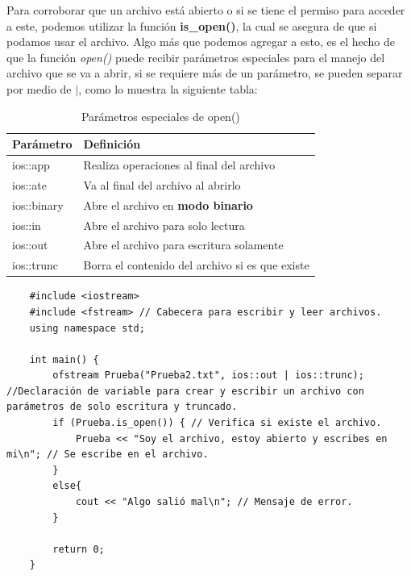 Para corroborar que un archivo está abierto o si se tiene el permiso para acceder a este, podemos utilizar la función \textbf{is\_open()}, la cual se asegura de que si podamos usar el archivo. Algo más que podemos agregar a esto, es el hecho de que la función \textit{open()} puede recibir parámetros especiales para el manejo del archivo que se va a abrir, si se requiere más de un parámetro, se pueden separar por medio de $|$, como lo muestra la siguiente tabla:
\begin{table}[H]
    \begin{center}
        \caption{Parámetros especiales de open()}
        \label{tab: 15}
        \begin{tabular}{l l}
            \hline
            \textbf{Parámetro} & \textbf{Definición} \\
            \hline
            ios::app		& Realiza operaciones al final del archivo \\
            ios::ate		& Va al final del archivo al abrirlo \\
            ios::binary	& Abre el archivo en \textbf{modo binario} \\
            ios::in		& Abre el archivo para solo lectura \\
            ios::out		& Abre el archivo para escritura solamente \\
            ios::trunc	& Borra el contenido del archivo si es que existe \\
        \end{tabular}
    \end{center}
\end{table}
\begin{lstlisting}
    #include <iostream>
    #include <fstream> // Cabecera para escribir y leer archivos.
    using namespace std;
    
    int main() {
        ofstream Prueba("Prueba2.txt", ios::out | ios::trunc); //Declaración de variable para crear y escribir un archivo con parámetros de solo escritura y truncado.
        if (Prueba.is_open()) { // Verifica si existe el archivo.
            Prueba << "Soy el archivo, estoy abierto y escribes en mi\n"; // Se escribe en el archivo.
        }
        else{
            cout << "Algo salió mal\n"; // Mensaje de error.
        }
        
        return 0;
    }
\end{lstlisting}

